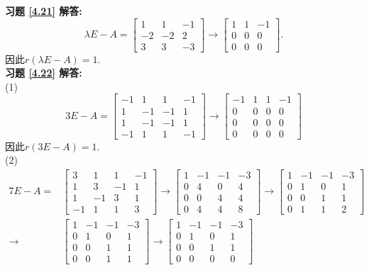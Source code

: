 \documentclass[a4paper]{book}
\begin{document}
\textbf{习题 \ref{4.21} 解答:}\\
$$\lambda E-A=\begin{bmatrix}1&1&-1\\-2&-2&2\\3&3&-3\end{bmatrix}\rightarrow\begin{bmatrix}1&1&-1\\0&0&0\\0&0&0\end{bmatrix}.$$ 因此$r(\lambda E-A)=1$.\\
\textbf{习题 \ref{4.22} 解答:}\\
(1) $$3E-A=\begin{bmatrix}-1&1&1&-1\\1&-1&-1&1\\1&-1&-1&1\\-1&1&1&-1\end{bmatrix}\rightarrow \begin{bmatrix}-1&1&1&-1\\0&0&0&0\\0&0&0&0\\0&0&0&0\end{bmatrix}$$
因此$r(3E-A)=1.$\\
(2)\begin{displaymath}\begin{aligned}7E-A=&\begin{bmatrix}3&1&1&-1\\1&3&-1&1\\1&-1&3&1\\-1&1&1&3\end{bmatrix}
\rightarrow \begin{bmatrix}1&-1&-1&-3\\0&4&0&4\\0&0&4&4\\0&4&4&8\end{bmatrix}
\rightarrow  \begin{bmatrix}1&-1&-1&-3\\0&1&0&1\\0&0&1&1\\0&1&1&2\end{bmatrix}\\
\rightarrow & \begin{bmatrix}1&-1&-1&-3\\0&1&0&1\\0&0&1&1\\0&0&1&1\end{bmatrix}
\rightarrow  \begin{bmatrix}1&-1&-1&-3\\0&1&0&1\\0&0&1&1\\0&0&0&0\end{bmatrix}
\end{aligned}\end{displaymath}
\end{document}
